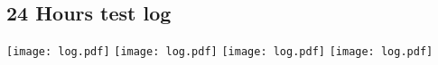 \chapter{}
\label{"apx:log"}

\section{24 Hours test log}
\label{"apx:log_sec"}
\centering
\newpage
\texttt{[image: log.pdf]}
\newpage
\texttt{[image: log.pdf]}
\newpage
\texttt{[image: log.pdf]}
\newpage
\texttt{[image: log.pdf]}